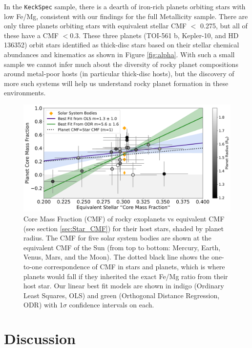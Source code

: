 \documentclass[twocolumn]{aastex631}
\begin{document}
In the \texttt{KeckSpec} sample, there is a dearth of iron-rich planets orbiting stars with low Fe/Mg, consistent with our findings for the full Metallicity sample. There are only three planets orbiting stars with equivalent stellar CMF $<$ 0.275, but all of these have a CMF $<$0.3. These three planets (TOI-561 b, Kepler-10, and HD 136352) orbit stars identified as thick-disc stars based on their stellar chemical abundances and kinematics \citep{2021AJ....161...56W, 2020AJ....160..129K, 2011ApJ...729...27B} as shown in Figure \ref{fig:alpha}. With such a small sample we cannot infer much about the diversity of rocky planet compositions around metal-poor hosts (in particular thick-disc hosts), but the discovery of more such systems will help us understand rocky planet formation in these environments.


 \begin{figure}
  
    \includegraphics[width=1.0\textwidth]{New_CMF_All.png}

   
    \caption{Core Mass Fraction (CMF) of rocky exoplanets vs equivalent CMF (see section \ref{sec:Star_CMF}) for their host stars, shaded by planet radius. The CMF for five solar system bodies are shown at the equivalent CMF of the Sun (from top to bottom: Mercury, Earth, Venus, Mars, and the Moon). The dotted black line shows the one-to-one correspondence of CMF in stars and planets, which is where planets would fall if they inherited the exact Fe/Mg ratio from their host star. Our linear best fit models are shown in indigo (Ordinary Least Squares, OLS) and green (Orthogonal Distance Regression, ODR) with 1$\sigma$ confidence intervals on each.}
    \label{fig:FeMg}
\end{figure}

\section{Discussion}
\label{sec:discussion}
\end{document}
